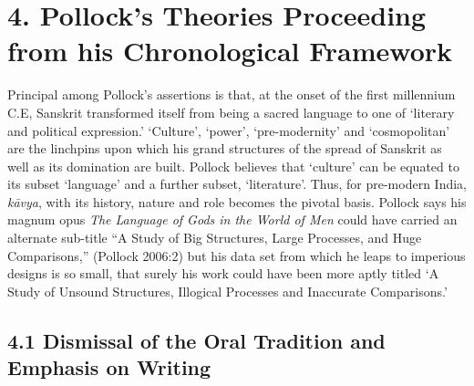 \section*{4. Pollock’s Theories Proceeding from his Chronological Framework}

Principal among Pollock’s assertions is that, at the onset of the first millennium C.E, Sanskrit transformed itself from being a sacred language to one of ‘literary and political expression.’ ‘Culture’, ‘power’, ‘pre-modernity’ and ‘cosmopolitan’ are the linchpins upon which his grand structures of the spread of Sanskrit as well as its domination are built. Pollock believes that ‘culture’ can be equated to its subset ‘language’ and a further subset, ‘literature’. Thus, for pre-modern India, \textit{kāvya}, with its history, nature and role becomes the pivotal basis. Pollock says his magnum opus \textit{The Language of Gods in the World of Men} could have carried an alternate sub-title “A Study of Big Structures, Large Processes, and Huge Comparisons,” (Pollock 2006:2) but his data set from which he leaps to imperious designs is so small, that surely his work could have been more aptly titled ‘A Study of Unsound Structures, Illogical Processes and Inaccurate Comparisons.’

\subsection*{4.1 Dismissal of the Oral Tradition and Emphasis on Writing}


